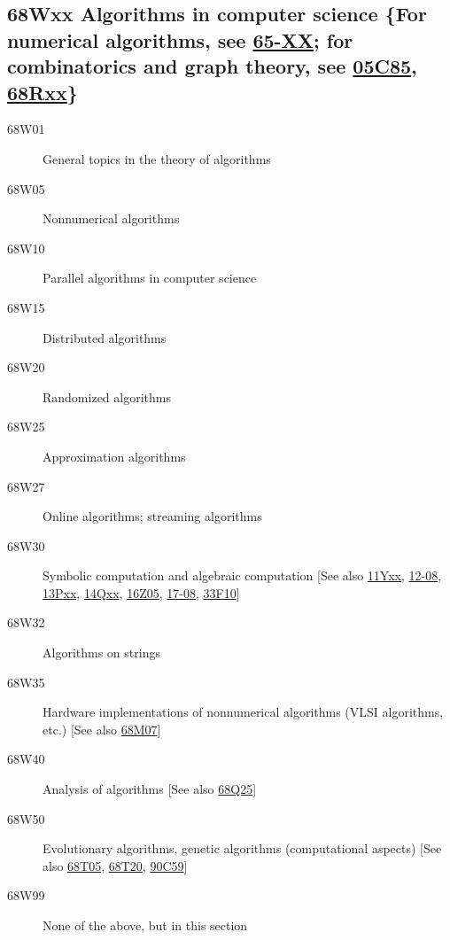 \documentclass[letterpaper]{article}
\begin{document}
\subsection*{68Wxx  Algorithms in computer science \{For numerical algorithms, see \hyperref[65-XX]{65-XX}; for combinatorics and graph theory, see \hyperref[05C85]{05C85}, \hyperref[68Rxx]{68Rxx}\} }\label{68Wxx}
\begin{description}
\item [68W01]\label{68W01} General topics in the theory of algorithms
\item [68W05]\label{68W05} Nonnumerical algorithms
\item [68W10]\label{68W10} Parallel algorithms in computer science
\item [68W15]\label{68W15} Distributed algorithms
\item [68W20]\label{68W20} Randomized algorithms
\item [68W25]\label{68W25} Approximation algorithms
\item [68W27]\label{68W27} Online algorithms; streaming algorithms
\item [68W30]\label{68W30} Symbolic computation and algebraic computation [See also \hyperref[11Yxx]{11Yxx}, \hyperref[12-08]{12-08}, \hyperref[13Pxx]{13Pxx}, \hyperref[14Qxx]{14Qxx}, \hyperref[16Z05]{16Z05}, \hyperref[17-08]{17-08}, \hyperref[33F10]{33F10}]
\item [68W32]\label{68W32} Algorithms on strings
\item [68W35]\label{68W35} Hardware implementations of nonnumerical algorithms (VLSI algorithms, etc.) [See also \hyperref[68M07]{68M07}]
\item [68W40]\label{68W40} Analysis of algorithms [See also \hyperref[68Q25]{68Q25}]
\item [68W50]\label{68W50} Evolutionary algorithms, genetic algorithms (computational aspects) [See also \hyperref[68T05]{68T05}, \hyperref[68T20]{68T20}, \hyperref[90C59]{90C59}]
\item [68W99]\label{68W99} None of the above, but in this section
\end{description}
\end{document}
